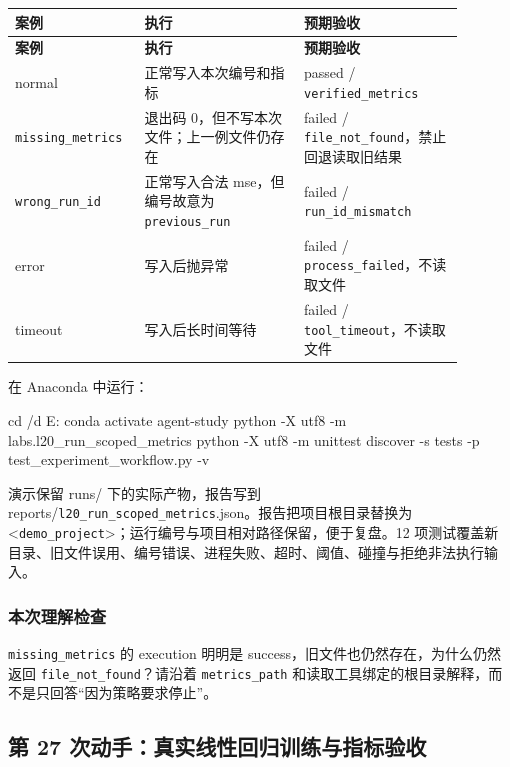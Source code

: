 \documentclass[UTF8,zihao=-4,fontset=fandol]{ctexart}
\begin{document}
{\small\setlength{\tabcolsep}{4pt}
\renewcommand{\arraystretch}{1.25}
\begin{longtable}{>{\raggedright\arraybackslash}p{0.23\linewidth}>{\raggedright\arraybackslash}p{0.33\linewidth}>{\raggedright\arraybackslash}p{0.33\linewidth}}
\toprule
\textbf{案例} & \textbf{执行} & \textbf{预期验收} \\
\midrule\endfirsthead
\toprule
\textbf{案例} & \textbf{执行} & \textbf{预期验收} \\
\midrule\endhead
\bottomrule\endfoot
normal & 正常写入本次编号和指标 & passed / \nolinkurl{verified_metrics} \\
\nolinkurl{missing_metrics} & 退出码 0，但不写本次文件；上一例文件仍存在 & failed / \nolinkurl{file_not_found}，禁止回退读取旧结果 \\
\nolinkurl{wrong_run_id} & 正常写入合法 mse，但编号故意为 \nolinkurl{previous_run} & failed / \nolinkurl{run_id_mismatch} \\
error & 写入后抛异常 & failed / \nolinkurl{process_failed}，不读取文件 \\
timeout & 写入后长时间等待 & failed / \nolinkurl{tool_timeout}，不读取文件 \\
\end{longtable}}

在 Anaconda 中运行：

\begin{Code}
cd /d E:\study\agent
conda activate agent-study
python -X utf8 -m labs.l20_run_scoped_metrics
python -X utf8 -m unittest discover -s tests -p test_experiment_workflow.py -v
\end{Code}

演示保留 runs/ 下的实际产物，报告写到 reports/\nolinkurl{l20_run_scoped_metrics}.json。报告把项目根目录替换为 <\nolinkurl{demo_project}>；运行编号与项目相对路径保留，便于复盘。12 项测试覆盖新目录、旧文件误用、编号错误、进程失败、超时、阈值、碰撞与拒绝非法执行输入。

\subsubsection{本次理解检查}

\nolinkurl{missing_metrics} 的 execution 明明是 success，旧文件也仍然存在，为什么仍然返回 \nolinkurl{file_not_found}？请沿着 \nolinkurl{metrics_path} 和读取工具绑定的根目录解释，而不是只回答“因为策略要求停止”。

\subsection{第 27 次动手：真实线性回归训练与指标验收}
\end{document}
